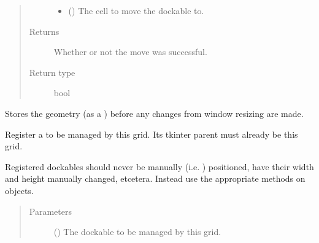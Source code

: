 \documentclass[letterpaper,10pt,english,openany,oneside]{sphinxmanual}
\begin{document}
\begin{fulllineitems}
\begin{fulllineitems}
\begin{quote}
\begin{description}
\begin{itemize}
\item {} 
 ({\hyperref[\detokenize{api:spookyconsole.gui.core.Cell}]{}}) \textendash{} The cell to move the dockable to.

\end{itemize}

\item[{Returns}] \leavevmode
Whether or not the move was successful.

\item[{Return type}] \leavevmode
bool

\end{description}\end{quote}

\end{fulllineitems}


\begin{fulllineitems}
\label{\detokenize{api:spookyconsole.gui.core.Grid.orig_geometry}}
Stores the geometry (as a ) before any changes from window resizing are made.

\end{fulllineitems}


\begin{fulllineitems}
\label{\detokenize{api:spookyconsole.gui.core.Grid.register_dockable}}
Register a  to be managed by this grid. Its tkinter parent must already be this grid.

Registered dockables should never be manually (i.e. ) positioned, have their width
and height manually changed, etcetera. Instead use the appropriate methods on  objects.
\begin{quote}\begin{description}
\item[{Parameters}] \leavevmode
{} () \textendash{} The dockable to be managed by this grid.


\end{description}
\end{quote}
\end{fulllineitems}
\end{fulllineitems}
\end{document}

